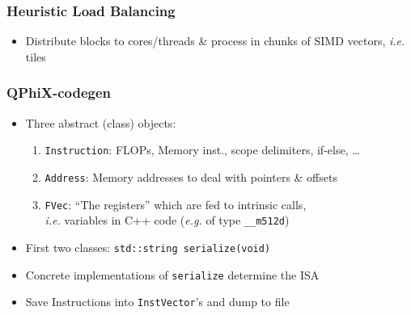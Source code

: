 \documentclass{beamer}
\begin{document}

  \begin{frame}
    \frametitle{Heuristic Load Balancing}

    \begin{itemize}
      \item Distribute blocks to cores/threads \& process in chunks
        of SIMD vectors, \textit{i.e.} tiles
        \vfill
    \end{itemize}

  \end{frame}


  \begin{frame}
    \frametitle{QPhiX-codegen}

    \begin{itemize}

      \item Three abstract (class) objects:
        \begin{enumerate}
          \item \texttt{Instruction}: FLOPs, Memory inst., scope delimiters, if-else, \dots
          \item \texttt{Address}: Memory addresses to deal with pointers \& offsets
          \item \texttt{FVec}: ``The registers'' which are fed to intrinsic calls,\\ \textit{i.e.}
            variables in C++ code (\textit{e.g.} of type \texttt{\_\_m512d})
        \end{enumerate}
        \vfill

      \item First two classes: \;\; \texttt{std::string serialize(void)}
        \vfill

      \item Concrete implementations of \texttt{serialize} determine the ISA
        \vfill

      \item Save Instructions into \texttt{InstVector}'s and dump to file

    \end{itemize}

  \end{frame}

\end{document}
